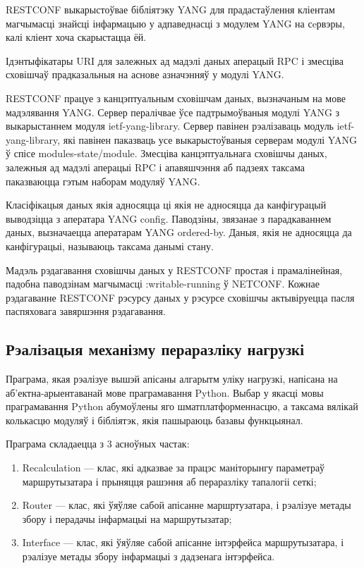 RESTCONF выкарыстоўвае бібліятэку YANG для прадастаўлення кліентам магчымасці знайсці інфармацыю у адпаведнасці з модулем YANG на сeрвэры, калі кліент хоча скарыстацца ёй.

Ідэнтыфікатары URI для залежных ад мадэлі даных аперацый RPC і змесціва сховішчаў прадказальныя на аснове азначэнняў у модулі YANG.

RESTCONF працуе з канцэптуальным сховішчам даных, вызначаным на мове мадэлявання YANG. Сервер пералічвае ўсе падтрымоўваныя модулі YANG з выкарыстаннем модуля ietf-yang-library. Сервер павінен рэалізаваць модуль ietf-yang-library, які павінен паказваць усе выкарыстоўваныя серверам модулі YANG ў спісе modules-state/module. Змесціва канцэптуальнага сховішчы даных, залежныя ад мадэлі аперацыі RPC і апавяшчэння аб падзеях таксама паказваюцца гэтым наборам модуляў YANG.

Класіфікацыя даных якія адносяцца ці якія не адносяцца да канфігурацый выводзіцца з аператара YANG config. Паводзіны, звязанае з парадкаваннем даных, вызначаецца аператарам YANG ordered-by. Даныя, якія не адносяцца да канфігурацыі, называюць таксама данымі стану.

Мадэль рэдагавання сховішчы даных у RESTCONF простая і прамалінейная, падобна паводзінам магчымасці :writable-running ў NETCONF. Кожнае рэдагаванне RESTCONF рэсурсу даных у рэсурсе сховішчы актывіруецца пасля паспяховага завяршэння рэдагавання.

\subsection{Рэалізацыя механізму пераразліку нагрузкі}

Праграма, якая рэалізуе вышэй апісаны алгарытм уліку нагрузкі, напісана
на аб'ектна-арыентаванай мове праграмавання Python. Выбар у якасці мовы праграмавання
Python абумоўлены яго шматплатформеннасцю, а таксама вялікай колькасцю модуляў і бібліятэк, якія пашыраюць базавы функцыянал.

Праграма складаецца з 3 асноўных частак:
\begin{enumerate}
    \item Recalculation --- клас, які адказвае за працэс маніторынгу параметраў маршрутызатара і прыняцця рашэння аб
    пераразліку тапалогіі сеткі;
    \item Router --- клас, які ўяўляе сабой апісанне маршртузатара, і рэалізуе
    метады збору і перадачы інфармацыі на маршрутызатар;
    \item Interface --- клас, які ўяўляе сабой апісанне інтэрфейса маршрутызатара,
    і рэалізуе метады збору інфармацыі з дадзенага інтэрфейса.
\end{enumerate}

